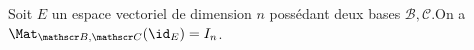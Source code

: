Soit $E$ un espace vectoriel de dimension $n$ possédant deux bases $\mathscr B, \mathscr C$.\newline  On a $\Mat_{\mathscr B,\mathscr C}(\id_E) = I_n$.

\begin{reponses}
\end{reponses}

